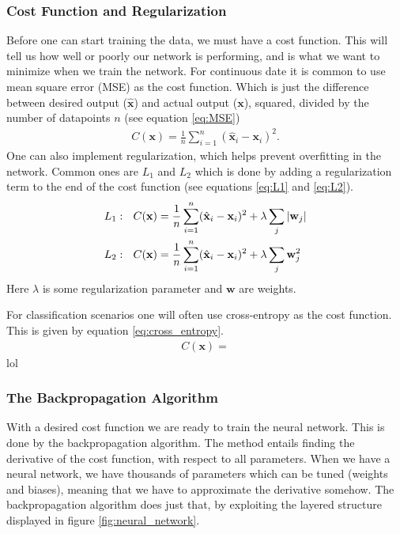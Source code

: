 \documentclass[12pt]{extarticle}
\begin{document}
\subsubsection{Cost Function and Regularization}\label{sec:cost_func_and_regul}
Before one can start training the data, we must have a cost function. This will tell us how well or poorly our network is performing, and is what we want to minimize when we train the network. For continuous date it is common to use mean square error (MSE) as the cost function. Which is just the difference between desired output ($\hat{\mathbf{x}}$) and actual output ($\mathbf{x}$), squared, divided by the number of datapoints $n$ (see equation \eqref{eq:MSE})
\begin{align}
	C(\mathbf{x}) = \frac{1}{n}\sum_{i=1}^{n}(\hat{\mathbf{x}}_i - \mathbf{x}_i)^2.
	\label{eq:MSE}
\end{align}
One can also implement regularization, which helps prevent overfitting in the network. Common ones are $L_1$ and $L_2$ which is done by adding a regularization term to the end of the cost function (see equations \eqref{eq:L1} and \eqref{eq:L2}).
\begin{align}
	L_1: \ \ C(\mathbf{x}) &= \frac{1}{n}\sum_{i=1}^{n}(\hat{\mathbf{x}}_i - \mathbf{x}_i)^2 + \lambda\sum_j \abs{\mathbf{w}_j} \label{eq:L1} \\
	L_2: \ \ C(\mathbf{x}) &= \frac{1}{n}\sum_{i=1}^{n}(\hat{\mathbf{x}}_i - \mathbf{x}_i)^2 + \lambda\sum_j \mathbf{w}^2_j \label{eq:L2}
\end{align}
Here $\lambda$ is some regularization parameter and $\mathbf{w}$ are weights.

For classification scenarios one will often use cross-entropy as the cost function. This is given by equation \eqref{eq:cross_entropy}.
\begin{align}
	C(\mathbf{x}) = 
	\label{eq:cross_entropy}
\end{align}
lol
\subsubsection{The Backpropagation Algorithm}
With a desired cost function we are ready to train the neural network. This is done by the backpropagation algorithm. The method entails finding the derivative of the cost function, with respect to all parameters. When we have a neural network, we have thousands of parameters which can be tuned (weights and biases), meaning that we have to approximate the derivative somehow. The backpropagation algorithm does just that, by exploiting the layered structure displayed in figure \ref{fig:neural_network}.
\end{document}
